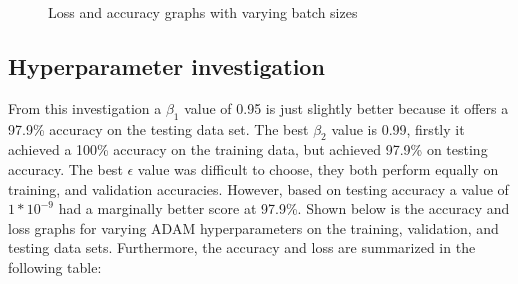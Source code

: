 \documentclass[12pt]{article}
\begin{document}
\begin{figure}[h]
  \hfill
  \hfill
  \caption{Loss and accuracy graphs with varying batch sizes}
\end{figure}

\newpage
\subsection{Hyperparameter investigation}

From this investigation a $\beta_1$ value of 0.95 is just slightly better because it offers a 97.9\%
accuracy on the testing data set. The best $\beta_2$ value is 0.99, firstly it achieved a 100\% accuracy
on the training data, but achieved 97.9\% on testing accuracy. The best $\epsilon$ value was difficult to choose,
they both perform equally on training, and validation accuracies. However, based on testing accuracy a value of $1*10^{-9}$
had a marginally better score at 97.9\%. 
\newline
Shown below is the accuracy and loss graphs for varying ADAM hyperparameters on the training, validation, and testing
data sets. Furthermore, the accuracy and loss are summarized in the following table:
\end{document}

